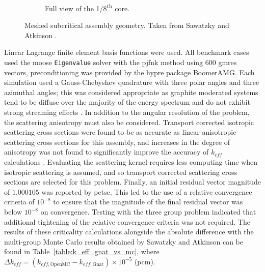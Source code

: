 \begin{figure}[H]
\begin{subfigure}[b]{0.48\textwidth}
        \caption{Full view of the 1/8\textsuperscript{th} core.}
        \label{table:subcritical_mesh_iso}
    \end{subfigure}
    \hfill
    \caption[Meshed subcritical assembly geometry.]{Meshed subcritical assembly geometry. Taken from Sawatzky and Atkinson \cite{ks_2024_subcritical}.}
    \label{table:subcritical_mesh}
\end{figure}
\noindent Linear Lagrange finite element basis functions were used. All benchmark cases used the \acrshort{moose} \texttt{Eigenvalue} solver with the \acrshort{pjfnk} method using 600 \acrshort{gmres} vectors, preconditioning was provided by the hypre package BoomerAMG. Each simulation used a Gauss-Chebyshev quadrature with three polar angles and three azimuthal angles; this was considered appropriate as graphite moderated systems tend to be diffuse over the majority of the energy spectrum and do not exhibit strong streaming effects \cite{ks_2024_subcritical}. In addition to the angular resolution of the problem, the scattering anisotropy must also be considered. Transport corrected isotropic scattering cross sections were found to be as accurate as linear anisotropic scattering cross sections for this assembly, and increases in the degree of anisotropy was not found to significantly improve the accuracy of $k_{eff}$ calculations \cite{ks_2024_subcritical}. Evaluating the scattering kernel requires less computing time when isotropic scattering is assumed, and so transport corrected scattering cross sections are selected for this problem. Finally, an initial residual vector magnitude of $1.000105$ was reported by \acrshort{petsc}. This led to the use of a relative convergence criteria of $10^{-8}$ to ensure that the magnitude of the final residual vector was below $10^{-8}$ on convergence. Testing with the three group problem indicated that additional tightening of the relative convergence criteria was not required. The results of these criticality calculations alongside the absolute difference with the multi-group Monte Carlo results obtained by Sawatzky and Atkinson \cite{ks_2024_subcritical} can be found in Table~\ref{table:k_eff_gnat_vs_mc}, where $\Delta k_{eff} =  (k_{eff, \text{OpenMC}} - k_{eff, \text{Gnat}})\times 10^{-5}$ (pcm).

